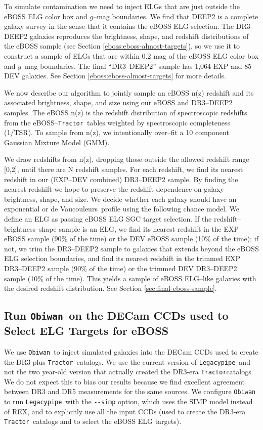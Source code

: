 \documentclass[a4paper,fleqn,usenatbib]{mnras}
\newcommand{\gb}{$g$}
\newcommand{\tractor}{{\tt Tractor}}
\newcommand{\legacypipe}{{\tt Legacypipe}}
\newcommand{\obiwan}{{\tt Obiwan}}
\newcommand{\dev}{de Vaucouleurs}
\begin{document}
To simulate contamination we need to inject ELGs that are just outside the eBOSS ELG color box and \gb--mag boundaries. We find that DEEP2 is a complete galaxy survey in the sense that it contains the eBOSS ELG selection. The DR3--DEEP2 galaxies reproduces the brightness, shape, and redshift distributions of the eBOSS sample (see Section \ref{eboss:eboss-almost-targets}), so we use it to construct a sample of ELGs that are within 0.2 mag of the eBOSS ELG color box and \gb--mag boundaries. The final ``DR3--DEEP2'' sample has 1,064 EXP and 85 DEV galaxies. See Section \ref{eboss:eboss-almost-targets} for more details.

We now describe our algorithm to jointly sample an eBOSS n(z) redshift and its associated brightness, shape, and size using our eBOSS and DR3--DEEP2 samples. The eBOSS n(z) is the redshift distribution of spectroscopic redshifts from the eBOSS--\tractor\, tables weighted by spectroscopic completeness (1/TSR). To sample from n(z), we intentionally over--fit a 10 component Gaussian Mixture Model (GMM).

We draw redshifts from n(z), dropping those outside the allowed redshift range [0,2], until there are N redshift samples. For each redshift, we find its nearest redshift in our (EXP--DEV combined) DR3--DEEP2 sample. By finding the nearest redshift we hope to preserve the redshift dependence on galaxy brightness, shape, and size. We decide whether each galaxy should have an exponential or \dev\, profile using the following chance model. We define an ELG as passing eBOSS ELG SGC target selection. If the redshift--brightness--shape sample is an ELG, we find its nearest redshift in the EXP eBOSS sample (90\% of the time) or the DEV eBOSS sample (10\% of the time); if not, we trim the DR3--DEEP2 sample to galaxies that extends beyond the eBOSS ELG selection boundaries, and find its nearest redshift in the trimmed EXP DR3--DEEP2 sample (90\% of the time) or the trimmed DEV DR3--DEEP2 sample (10\% of the time). This yields a sample of eBOSS ELG--like galaxies with the desired redshift distribution. See Section \ref{sec:final-eboss-sample}.

\subsection{Run \obiwan\, on the DECam CCDs used to Select ELG Targets for eBOSS}

We use \obiwan\, to inject simulated galaxies into the DECam CCDs used to create the DR3-plus \tractor\, catalogs. We use the current version of \legacypipe\, and not the two year-old version that actually created the DR3-era \tractor catalogs. We do not expect this to bias our results because we find excellent agreement between DR3 and DR5 measurements for the same sources. We configure \obiwan\, to run \legacypipe\, with the \verb|--simp| option, which uses the SIMP model instead of REX, and to explicitly use all the input CCDs (used to create the DR3-era \tractor\, catalogs and to select the eBOSS ELG targets).   
\end{document}
